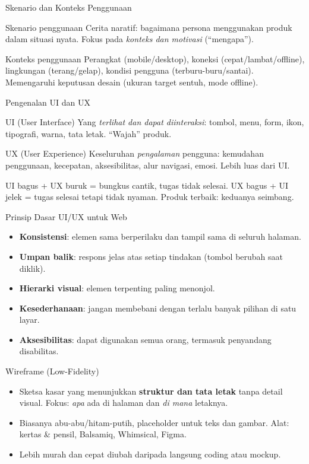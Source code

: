 \documentclass[handout]{beamer}
\begin{document}
\begin{frame}{Skenario dan Konteks Penggunaan}
	\begin{block}{Skenario penggunaan}
		Cerita naratif: bagaimana persona menggunakan produk dalam situasi nyata. Fokus pada \textit{konteks dan motivasi} (``mengapa'').
	\end{block}
	\begin{block}{Konteks penggunaan}
		Perangkat (mobile/desktop), koneksi (cepat/lambat/offline), lingkungan (terang/gelap), kondisi pengguna (terburu-buru/santai). Memengaruhi keputusan desain (ukuran target sentuh, mode offline).
	\end{block}
\end{frame}

\begin{frame}{Pengenalan UI dan UX}
	\begin{block}{UI (User Interface)}
		Yang \textit{terlihat dan dapat diinteraksi}: tombol, menu, form, ikon, tipografi, warna, tata letak. ``Wajah'' produk.
	\end{block}
	\begin{block}{UX (User Experience)}
		Keseluruhan \textit{pengalaman} pengguna: kemudahan penggunaan, kecepatan, aksesibilitas, alur navigasi, emosi. Lebih luas dari UI.
	\end{block}
	UI bagus + UX buruk = bungkus cantik, tugas tidak selesai. UX bagus + UI jelek = tugas selesai tetapi tidak nyaman. Produk terbaik: keduanya seimbang.
\end{frame}

\begin{frame}{Prinsip Dasar UI/UX untuk Web}
	\begin{itemize}
		\item \textbf{Konsistensi}: elemen sama berperilaku dan tampil sama di seluruh halaman.
		\item \textbf{Umpan balik}: respons jelas atas setiap tindakan (tombol berubah saat diklik).
		\item \textbf{Hierarki visual}: elemen terpenting paling menonjol.
		\item \textbf{Kesederhanaan}: jangan membebani dengan terlalu banyak pilihan di satu layar.
		\item \textbf{Aksesibilitas}: dapat digunakan semua orang, termasuk penyandang disabilitas.
	\end{itemize}
\end{frame}

\begin{frame}{Wireframe (Low-Fidelity)}
	\begin{itemize}
		\item Sketsa kasar yang menunjukkan \textbf{struktur dan tata letak} tanpa detail visual. Fokus: \textit{apa} ada di halaman dan \textit{di mana} letaknya.
		\item Biasanya abu-abu/hitam-putih, placeholder untuk teks dan gambar. Alat: kertas \& pensil, Balsamiq, Whimsical, Figma.
		\item Lebih murah dan cepat diubah daripada langsung coding atau mockup.
	\end{itemize}
\end{frame}
\end{document}
